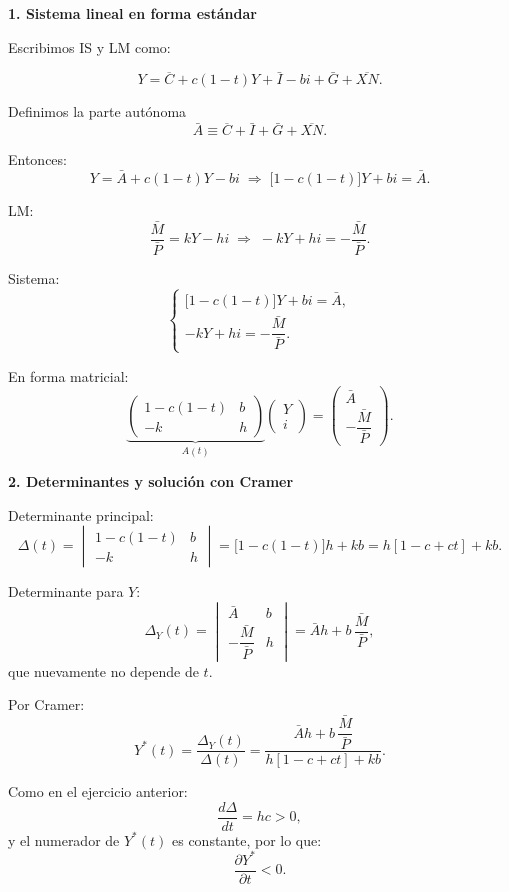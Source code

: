 \documentclass[11pt,addpoints]{article}
\begin{document}
\begin{enumerate}
\textbf{1. Sistema lineal en forma estándar}

Escribimos IS y LM como:

\[
Y = \overline{C} + c(1-t)Y + \bar{I} - b i + \bar{G} + \overline{XN}.
\]

Definimos la parte autónoma
\[
\bar{A} \equiv \overline{C} + \bar{I} + \bar{G} + \overline{XN}.
\]

Entonces:
\[
Y = \bar{A} + c(1-t)Y - b i
\;\Rightarrow\;
\big[1 - c(1-t)\big]Y + b i = \bar{A}.
\]

LM:
\[
\frac{\bar{M}}{\bar{P}} = kY - h i
\;\Rightarrow\;
-kY + h i = -\frac{\bar{M}}{\bar{P}}.
\]

Sistema:
\[
\begin{cases}
\big[1 - c(1-t)\big]Y + b i = \bar{A},\\[2pt]
-kY + h i = -\dfrac{\bar{M}}{\bar{P}}.
\end{cases}
\]

En forma matricial:
\[
\underbrace{\begin{pmatrix}
1 - c(1-t) & b\\
-k & h
\end{pmatrix}}_{A(t)}
\begin{pmatrix} Y \\[2pt] i \end{pmatrix}
=
\begin{pmatrix} \bar{A} \\[2pt] -\dfrac{\bar{M}}{\bar{P}} \end{pmatrix}.
\]

\textbf{2. Determinantes y solución con Cramer}

Determinante principal:
\[
\Delta(t) =
\begin{vmatrix}
1 - c(1-t) & b \\
-k & h
\end{vmatrix}
= \big[1 - c(1-t)\big]h + kb
= h[1 - c + ct] + kb.
\]

Determinante para $Y$:
\[
\Delta_Y(t) =
\begin{vmatrix}
\bar{A} & b \\
-\dfrac{\bar{M}}{\bar{P}} & h
\end{vmatrix}
= \bar{A}h + b\,\frac{\bar{M}}{\bar{P}},
\]
que nuevamente no depende de $t$.

Por Cramer:
\[
Y^*(t) = \frac{\Delta_Y(t)}{\Delta(t)}
= \frac{\bar{A}h + b\,\dfrac{\bar{M}}{\bar{P}}}{h[1 - c + ct] + kb}.
\]

\newpage
\vspace*{0.5cm}
Como en el ejercicio anterior:
\[
\frac{d\Delta}{dt} = hc > 0,
\]
y el numerador de $Y^*(t)$ es constante, por lo que:
\[
\frac{\partial Y^*}{\partial t} < 0.
\]


\end{enumerate}
\end{document}
